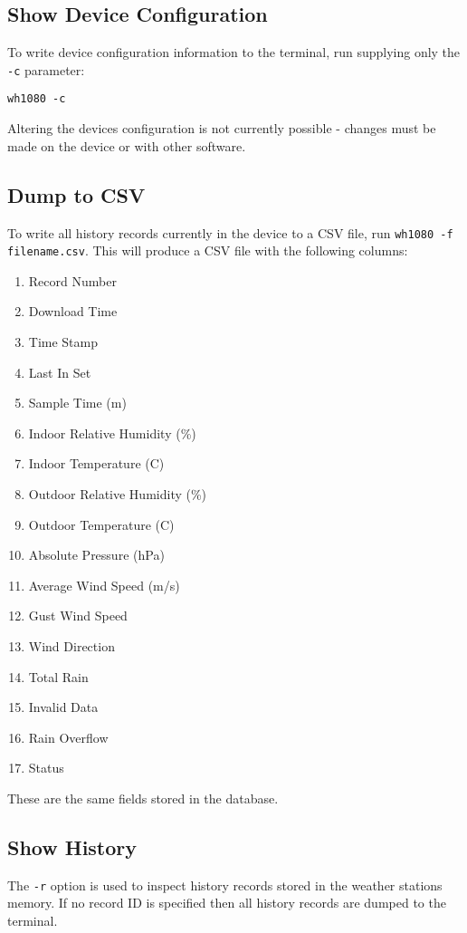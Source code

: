 \documentclass[a4paper,10pt,draft]{book}
\begin{document}
\subsection{Show Device Configuration}
To write device configuration information to the terminal, run supplying only the \verb|-c| parameter:

\verb|wh1080 -c|

Altering the devices configuration is not currently possible - changes must be made on the device or with other software.

\subsection{Dump to CSV}
To write all history records currently in the device to a CSV file, run
\verb|wh1080 -f filename.csv|. This will produce a CSV file with the following columns:
\begin{enumerate}
\item Record Number
\item Download Time
\item Time Stamp
\item Last In Set
\item Sample Time (m)
\item Indoor Relative Humidity (\%)
\item Indoor Temperature (C)
\item Outdoor Relative Humidity (\%)
\item Outdoor Temperature (C)
\item Absolute Pressure (hPa)
\item Average Wind Speed (m/s)
\item Gust Wind Speed
\item Wind Direction
\item Total Rain
\item Invalid Data
\item Rain Overflow
\item Status
\end{enumerate}

These are the same fields stored in the database.

\subsection{Show History}
The \verb|-r| option is used to inspect history records stored in the weather stations memory. If no record ID is specified then all history records are dumped to the terminal.
\end{document}
